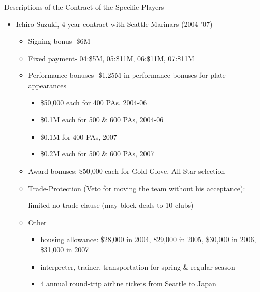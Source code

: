 \documentclass[dvipdfmx, 12pt]{article}
\begin{document}
\begin{table}
  \centering
  \small
  \caption{Descriptions of the Contract of the Specific Players}
  \label{Incentive_Contracts}
  \begin{itemize}
    \item Ichiro Suzuki, 4-year contract with Seattle Marinars (2004-'07)
    \begin{itemize}
      \item Signing bonus- \$6M

      \item Fixed payment- 04:\$5M, 05:\$11M, 06:\$11M, 07:\$11M

      \item Performance bonuses- \$1.25M in performance bonuses for plate appearances

      \begin{itemize}
        \item \$50,000 each for 400 PAs, 2004-06

        \item \$0.1M each for 500 \& 600 PAs, 2004-06

        \item \$0.1M for 400 PAs, 2007

        \item \$0.2M each for 500 \& 600 PAs, 2007
      \end{itemize}

      \item Award bonuses: \$50,000 each for Gold Glove, All Star selection

      \item Trade-Protection (Veto for moving the team without his acceptance):

      limited no-trade clause (may block deals to 10 clubs)

      \item Other

      \begin{itemize}
        \item housing allowance: \$28,000 in 2004, \$29,000 in 2005, \$30,000 in 2006, \$31,000 in 2007

        \item interpreter, trainer, transportation for spring \& regular season

        \item 4 annual round-trip airline tickets from Seattle to Japan
      \end{itemize}
    \end{itemize}
  \end{itemize}
\end{table}
\end{document}
